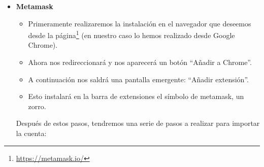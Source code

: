 \begin{itemize}
	\item \textbf{Metamask\label{ref:install}} 
	\begin{itemize}
		\item Primeramente realizaremos la instalación en el navegador que deseemos desde la página\footnote{\url{https://metamask.io/}} (en nuestro caso lo hemos realizado desde Google Chrome).
		\item Ahora nos redireccionará y nos aparecerá un botón ``Añadir a Chrome''. 
		\item A continuación nos saldrá una pantalla emergente: ``Añadir extensión''. 
		\item Esto instalará en la barra de extensiones el símbolo de metamask, un zorro. 
	\end{itemize}

Después de estos pasos, tendremos una serie de pasos a realizar para importar la cuenta:
	

\end{itemize}
